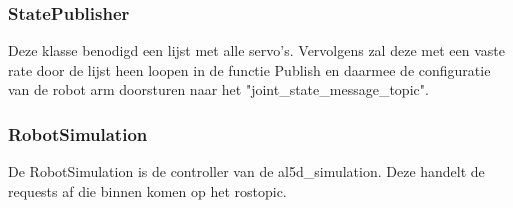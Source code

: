 \documentclass[11pt,titlepage]{article}
\begin{document}
\subsubsection{StatePublisher}
Deze klasse benodigd een lijst met alle servo's. Vervolgens zal deze met een vaste rate door de lijst heen loopen in de functie Publish en daarmee de configuratie van de robot arm doorsturen naar het "joint\_state\_message\_topic".

\subsubsection{RobotSimulation}
De RobotSimulation is de controller van de al5d\_simulation. Deze handelt de requests af die binnen komen op het rostopic.
\end{document}
